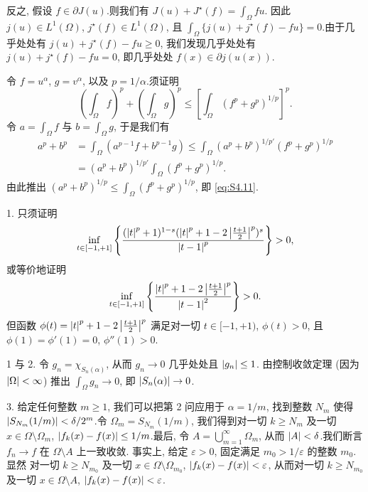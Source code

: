 反之, 假设 $f\in\partial J(u)$.则我们有 $J(u)+J^\star(f)=\int_\Omega fu$.
因此 $j(u)\in L^1(\Omega)$, $j^\star(f)\in L^1(\Omega)$, 且
$\int_\Omega\{j(u)+j^\star(f)-fu\}=0$.由于几乎处处有 $j(u)+j^\star(f)-fu\ge0$,
我们发现几乎处处有 $j(u)+j^\star(f)-fu=0$, 即几乎处处 $f(x)\in\partial j(u(x))$.


令 $f=u^\alpha$, $g=v^\alpha$, 以及 $p=1/\alpha$.须证明
\begin{equation}
\left(\int_\Omega f\right)^p+\left(\int_\Omega g\right)^p
\le\left[\int_\Omega(f^p+g^p)^{1/p}\right]^p.
\tag{S1}
\label{eq:S4.11}
\end{equation}
令 $a=\int_\Omega f$ 与 $b=\int_\Omega g$, 于是我们有
\begin{align*}
a^p+b^p&=\int_\Omega(a^{p-1}f+b^{p-1}g)\le\int_\Omega(a^p+b^p)^{1/p'}(f^p+g^p)^{1/p}\\
&=(a^p+b^p)^{1/p'}\int_\Omega(f^p+g^p)^{1/p}.
\end{align*}
由此推出 $(a^p+b^p)^{1/p}\le\int_\Omega(f^p+g^p)^{1/p}$, 即 \eqref{eq:S4.11}.


1. 只须证明
\begin{equation*}
\inf_{t\in[-1,+1]}\left\{\frac{(\left|t\right|^p+1)^{1-s}(\left|t\right|^p+1-2\left|\frac{t+1}{2}\right|^p)^s}{\left|t-1\right|^p}\right\}>0,
\end{equation*}
或等价地证明
\begin{equation*}
\inf_{t\in[-1,+1]}\left\{\frac{\left|t\right|^p+1-2\left|\frac{t+1}{2}\right|^p}{\left|t-1\right|^2}\right\}>0.
\end{equation*}
但函数 $\phi(t)=\left|t\right|^p+1-2\left|\frac{t+1}{2}\right|^p$ 满足对一切 $t\in[-1,+1)$,
$\phi(t)>0$, 且 $\phi(1)=\phi'(1)=0$, $\phi''(1)>0$.


1 与 2. 令 $g_n=\chi_{S_n(\alpha)}$, 从而 $g_n\to0$ 几乎处处且 $\left|g_n\right|\le1$.
由控制收敛定理 (因为 $\left|\Omega\right|<\infty$) 推出 $\int_\Omega g_n\to0$, 即
$\left|S_n(\alpha)\right|\to0$.

3. 给定任何整数 $m\ge1$, 我们可以把第 2 问应用于 $\alpha=1/m$, 找到整数
$N_m$ 使得 $\left|S_{N_m}(1/m)\right|<\delta/2^m$.令 $\Omega_m=S_{N_m}(1/m)$,
我们得到对一切 $k\ge N_m$ 及一切 $x\in\Omega\setminus\Omega_m$,
$\left|f_k(x)-f(x)\right|\le1/m$.最后, 令 $A=\bigcup_{m=1}^\infty\Omega_m$, 从而
$\left|A\right|<\delta$.我们断言 $f_n\to f$ 在 $\Omega\setminus A$ 上一致收敛.
事实上, 给定 $\varepsilon>0$, 固定满足 $m_0>1/\varepsilon$ 的整数 $m_0$.显然
对一切 $k\ge N_{m_0}$ 及一切 $x\in\Omega\setminus\Omega_{m_0}$,
$\left|f_k(x)-f(x)\right|<\varepsilon$, 从而对一切 $k\ge N_{m_0}$ 及一切
$x\in\Omega\setminus A$, $\left|f_k(x)-f(x)\right|<\varepsilon$.

